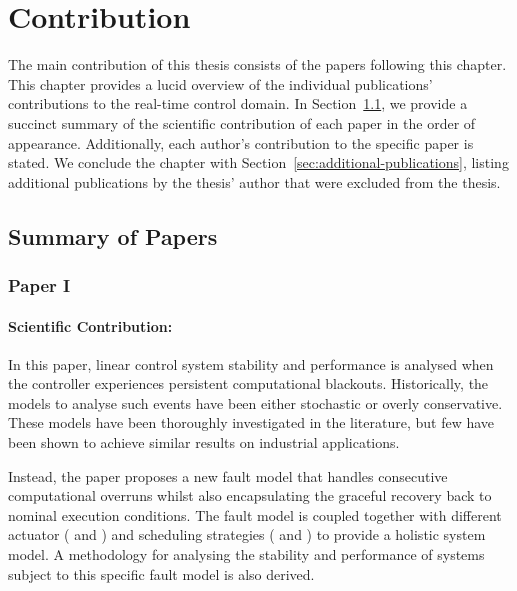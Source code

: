 \chapter{Contribution}

The main contribution of this thesis consists of the  papers following this chapter.
This chapter provides a lucid overview of the individual publications' contributions to the real-time control domain.
In Section~\ref{sec:paper-summaries}, we provide a succinct summary of the scientific contribution of each paper in the order of appearance.
Additionally, each author's contribution to the specific paper is stated.
We conclude the chapter with Section~\ref{sec:additional-publications}, listing additional publications by the thesis' author that were excluded from the thesis.

\clearpage %

\section{Summary of Papers}%
\label{sec:paper-summaries}%
%
\subsection*{Paper I}%
%
\begin{quote}
\end{quote}

\subsubsection*{Scientific Contribution:}%
%
In this paper, linear control system stability and performance is analysed when the controller experiences persistent computational blackouts.
Historically, the models to analyse such events have been either stochastic or overly conservative.
These models have been thoroughly investigated in the literature, but few have been shown to achieve similar results on industrial applications.

Instead, the paper proposes a new fault model that handles consecutive computational overruns whilst also encapsulating the graceful recovery back to nominal execution conditions.
The fault model is coupled together with different actuator (\tZ{} and \tH{}) and scheduling strategies (\tK{} and \tS{}) to provide a holistic system model.
A methodology for analysing the stability and performance of systems subject to this specific fault model is also derived.

